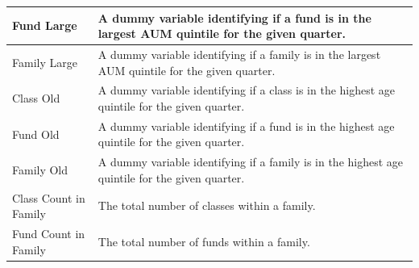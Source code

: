 \begin{longtable}{lp{}}
    \midrule
    Fund Large                     & A dummy variable identifying if a fund is in the largest AUM quintile for the given quarter.                                                                                                                                                                                                                      \\
    \midrule
    Family Large                   & A dummy variable identifying if a family is in the largest AUM quintile for the given quarter.                                                                                                                                                                                                                    \\
    \midrule
    Class Old                      & A dummy variable identifying if a class is in the highest age quintile for the given quarter.                                                                                                                                                                                                                     \\
    \midrule
    Fund Old                       & A dummy variable identifying if a fund is in the highest age quintile for the given quarter.                                                                                                                                                                                                                      \\
    \midrule
    Family Old                     & A dummy variable identifying if a family is in the highest age quintile for the given quarter.                                                                                                                                                                                                                    \\
    \midrule
    Class Count in Family          & The total number of classes within a family.                                                                                                                                                                                                                                                                      \\
    \midrule
    Fund Count in Family           & The total number of funds within a family.                                                                                                                                                                                                                                                                        \\
    \bottomrule
\end{longtable}
